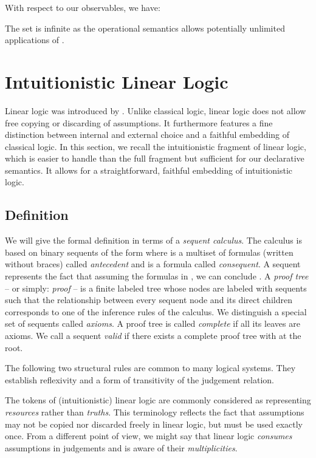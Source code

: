 \documentclass[acmtocl]{acmtrans2m}
\begin{document}
With respect to our observables, we have:

The set  is infinite
as the operational semantics  allows potentially unlimited applications of .

\section{Intuitionistic Linear Logic}
  \label{sec:ill}

Linear logic was introduced by
. Unlike classical logic, linear logic does
not allow free copying or discarding of assumptions. It furthermore features a fine
distinction between internal and external choice and a faithful embedding of
classical logic. In this section, we recall the intuitionistic fragment of linear
logic, which is easier to handle than the full fragment but sufficient for
our declarative semantics. It allows for a straightforward, faithful embedding of
intuitionistic logic.

\subsection{Definition}

We will give the formal definition in terms of a \emph{sequent calculus}. The
calculus is based on binary sequents of the form  where  is a multiset of formulas (written without braces) called
\emph{antecedent} and  is a formula called \emph{consequent}. A sequent
 represents the fact that assuming the formulas in
, we can conclude . A \emph{proof tree} -- or simply:
\emph{proof} -- is a finite labeled tree whose nodes are labeled with
sequents such that the relationship between every sequent node and its direct
children corresponds to one of the inference rules of the calculus. We
distinguish a special set of sequents called \emph{axioms}. A proof tree is
called \emph{complete} if all its leaves are axioms. We call a sequent
 \emph{valid} if there exists a complete proof tree 
with  at the root.

The following two structural rules are common to many logical systems. They establish
reflexivity and a form of transitivity of the judgement relation.



The tokens of (intuitionistic) linear logic are commonly considered as
representing \emph{resources} rather than \emph{truths}. This terminology
reflects the fact that assumptions may not be copied nor discarded freely in
linear logic, but must be used exactly once. From a different point of view, we
might say that linear logic \emph{consumes} assumptions in judgements and is
aware of their \emph{multiplicities}.
\end{document}
